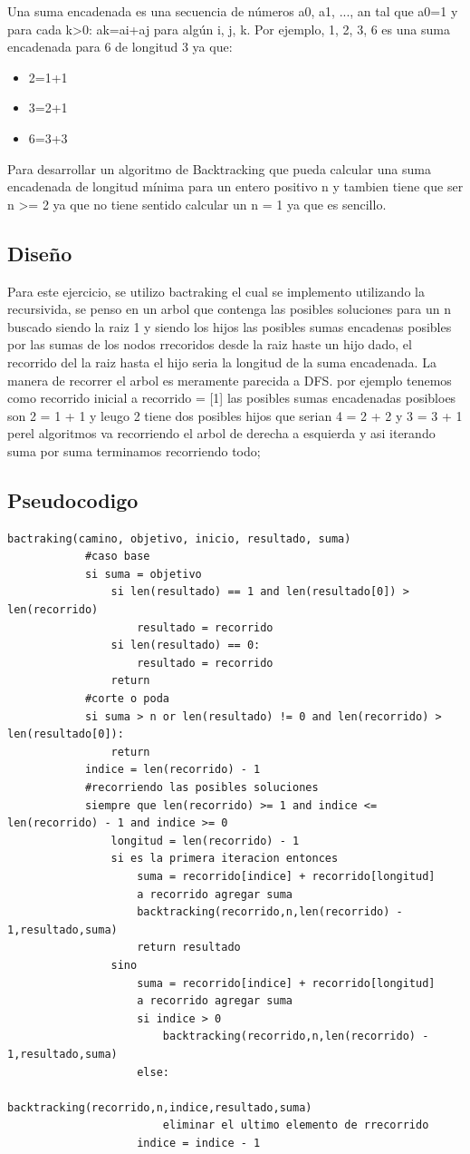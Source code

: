 \documentclass[a4paper, 12pt]{article}
\begin{document}
Una suma encadenada es una secuencia de números a0, a1, ..., an tal que a0=1 y para cada k>0: ak=ai+aj para algún i, j, k. Por ejemplo, 1, 2, 3, 6 es una suma encadenada para 6 de longitud 3 ya que:

\begin{itemize}
	\item 2=1+1
	\item 3=2+1
	\item 6=3+3
\end{itemize}

\indent Para desarrollar un algoritmo de Backtracking que pueda calcular una suma encadenada de longitud mínima para un entero positivo n y tambien tiene que ser n >= 2 ya que no tiene sentido calcular un n = 1 ya que es sencillo.

\subsection{Diseño}
Para este ejercicio, se utilizo bactraking el cual se implemento utilizando la recursivida, se penso en un arbol que contenga las posibles soluciones para un n buscado siendo la raiz 1 y siendo los hijos las posibles sumas encadenas posibles por las sumas de los nodos  rrecoridos desde la raiz haste un hijo dado, el recorrido del la raiz hasta el hijo seria la longitud de la suma encadenada. La manera de recorrer el arbol es meramente parecida a DFS.
    por ejemplo tenemos como recorrido inicial a recorrido = [1] las posibles sumas encadenadas posibloes son 2  = 1 + 1 y leugo 2 tiene dos posibles hijos que serian 4 = 2 + 2 y 3 = 3 + 1 perel algoritmos va recorriendo el arbol de derecha a esquierda y asi iterando suma por suma terminamos recorriendo todo;

\subsection{Pseudocodigo}
	\begin{lstlisting}[frame=single]
		bactraking(camino, objetivo, inicio, resultado, suma)
			#caso base
			si suma = objetivo
				si len(resultado) == 1 and len(resultado[0]) > len(recorrido)
					resultado = recorrido
				si len(resultado) == 0:
					resultado = recorrido
				return
			#corte o poda
			si suma > n or len(resultado) != 0 and len(recorrido) > len(resultado[0]):
				return
			indice = len(recorrido) - 1
			#recorriendo las posibles soluciones
			siempre que len(recorrido) >= 1 and indice <= len(recorrido) - 1 and indice >= 0
				longitud = len(recorrido) - 1
				si es la primera iteracion entonces
					suma = recorrido[indice] + recorrido[longitud]
					a recorrido agregar suma
					backtracking(recorrido,n,len(recorrido) - 1,resultado,suma)
					return resultado
				sino
					suma = recorrido[indice] + recorrido[longitud]
					a recorrido agregar suma
					si indice > 0
						backtracking(recorrido,n,len(recorrido) - 1,resultado,suma)
					else: 
						backtracking(recorrido,n,indice,resultado,suma)                   
						eliminar el ultimo elemento de rrecorrido
					indice = indice - 1	
			
	\end{lstlisting}
\end{document}
